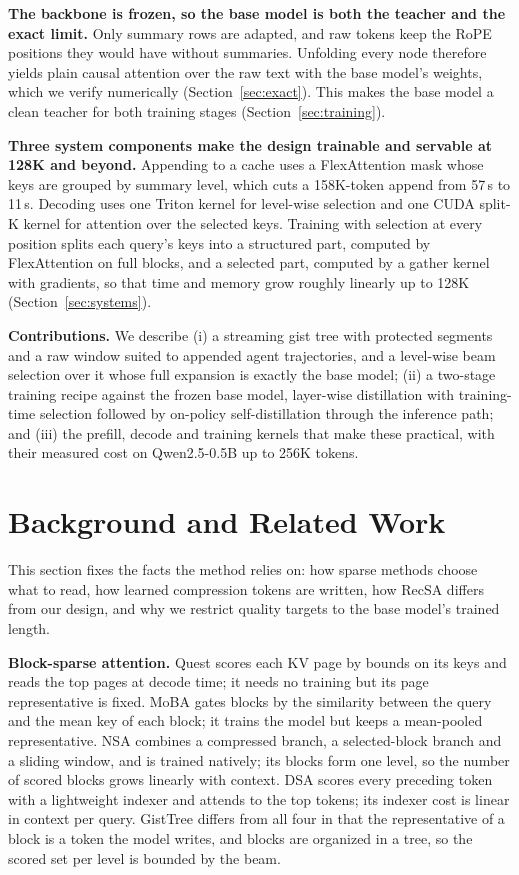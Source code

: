 \documentclass[10pt,twocolumn]{article}
\newcommand{\ours}{GistTree\xspace}
\newcommand{\para}[1]{\noindent\textbf{#1}\hspace{0.5em}}
\begin{document}
\para{The backbone is frozen, so the base model is both the teacher and the exact limit.}
Only summary rows are adapted, and raw tokens keep the RoPE positions they would have without
summaries. Unfolding every node therefore yields plain causal attention over the raw text with
the base model's weights, which we verify numerically (Section~\ref{sec:exact}). This makes
the base model a clean teacher for both training stages (Section~\ref{sec:training}).

\para{Three system components make the design trainable and servable at 128K and beyond.}
Appending to a cache uses a FlexAttention \citep{dong2024flex} mask whose keys are grouped by
summary level, which cuts a 158K-token append from 57\,s to 11\,s. Decoding uses one Triton
kernel for level-wise selection and one CUDA split-K kernel for attention over the selected
keys. Training with selection at every position splits each query's keys into a structured
part, computed by FlexAttention on full blocks, and a selected part, computed by a gather
kernel with gradients, so that time and memory grow roughly linearly up to 128K
(Section~\ref{sec:systems}).

\para{Contributions.}
We describe (i) a streaming gist tree with protected segments and a raw window suited to
appended agent trajectories, and a level-wise beam selection over it whose full expansion is
exactly the base model; (ii) a two-stage training recipe against the frozen base model,
layer-wise distillation with training-time selection followed by on-policy self-distillation
through the inference path; and (iii) the prefill, decode and training kernels that make
these practical, with their measured cost on Qwen2.5-0.5B up to 256K tokens.

\section{Background and Related Work}
\label{sec:related}

This section fixes the facts the method relies on: how sparse methods choose what to read,
how learned compression tokens are written, how RecSA differs from our design, and why we
restrict quality targets to the base model's trained length.

\para{Block-sparse attention.}
Quest \citep{tang2024quest} scores each KV page by bounds on its keys and reads the top
pages at decode time; it needs no training but its page representative is fixed.
MoBA \citep{lu2025moba} gates blocks by the similarity between the query and the mean key
of each block; it trains the model but keeps a mean-pooled representative.
NSA \citep{yuan2025nsa} combines a compressed branch, a selected-block branch and a sliding
window, and is trained natively; its blocks form one level, so the number of scored blocks
grows linearly with context.
DSA \citep{deepseek2025dsa} scores every preceding token with a lightweight indexer and
attends to the top tokens; its indexer cost is linear in context per query.
\ours differs from all four in that the representative of a block is a token the model writes,
and blocks are organized in a tree, so the scored set per level is bounded by the beam.
\end{document}
